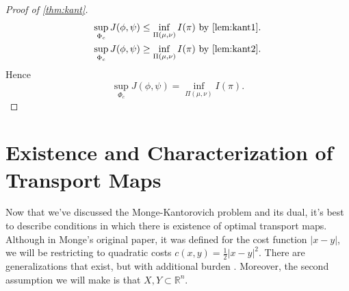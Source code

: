 \documentclass[12pt]{article}
\newcommand{\R}{\mathbb{R}}
\theoremstyle{plain}
\numberwithin{equation}{section}
\begin{document}
\begin{proof}[Proof of \autoref{thm:kant}]
  \begin{align*}
    \sup_{\Phi_c}J(\phi,\psi)\le \inf_{\Pi(\mu,\nu)}I(\pi) &\,\,\text{by \autoref{lem:kant1}}. \\
    \sup_{\Phi_c}J(\phi,\psi)\ge \inf_{\Pi(\mu,\nu)}I(\pi) &\,\,\text{by \autoref{lem:kant2}}.
  \end{align*}
  Hence
  \[ \sup_{\Phi_c}J(\phi,\psi)= \inf_{\Pi(\mu,\nu)}I(\pi).\]
\end{proof}
\newpage
\section{Existence and Characterization of Transport Maps}
Now that we've discussed the Monge-Kantorovich problem and its dual, it's best to describe conditions in which there is existence of optimal transport maps. Although in Monge's original paper, it was defined for the cost function $|x-y|$, we will be restricting to quadratic costs $c(x,y)=\frac{1}{2}|x-y|^2$. 
There are generalizations that exist, but with additional burden \cite{thorpe}. Moreover, the second assumption we will make is that $X,Y\subset \R^n$. 
\end{document}

